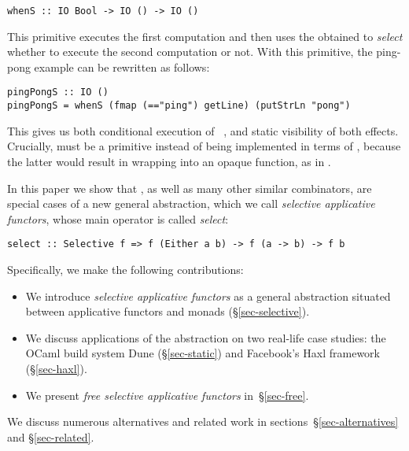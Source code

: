 \vspace{1mm}
\begin{verbatim}
whenS :: IO Bool -> IO () -> IO ()
\end{verbatim}
\vspace{1mm}

\noindent
This primitive executes the first computation and then uses the obtained
 to \emph{select} whether to execute the second computation or not.
With this primitive, the ping-pong example can be rewritten as follows:

\vspace{1mm}
\begin{verbatim}
pingPongS :: IO ()
pingPongS = whenS (fmap (=="ping") getLine) (putStrLn "pong")
\end{verbatim}
\vspace{1mm}

\noindent
This gives us both conditional execution of ~, and
static visibility of both effects. Crucially,  must be a primitive
instead of being implemented in terms of \hs{>>=}, because the latter would
result in wrapping  into an opaque function, as in .

In this paper we show that , as well as many other similar combinators,
are special cases of a new general abstraction, which we call \emph{selective
applicative functors}, whose main operator is called \emph{select}:

\vspace{1mm}
\begin{verbatim}
select :: Selective f => f (Either a b) -> f (a -> b) -> f b
\end{verbatim}
\vspace{1mm}

Specifically, we make the following contributions:

\begin{itemize}
    \item We introduce \emph{selective applicative functors} as a general
    abstraction situated between applicative functors and monads
    (\S\ref{sec-selective}).
    \item We discuss applications of the abstraction on two real-life case
    studies: the OCaml build system Dune (\S\ref{sec-static}) and Facebook's
    Haxl framework (\S\ref{sec-haxl}).
    \item We present \emph{free selective applicative functors}
    in~\S\ref{sec-free}.
\end{itemize}

We discuss numerous alternatives and related work in
sections~\S\ref{sec-alternatives} and \S\ref{sec-related}.
